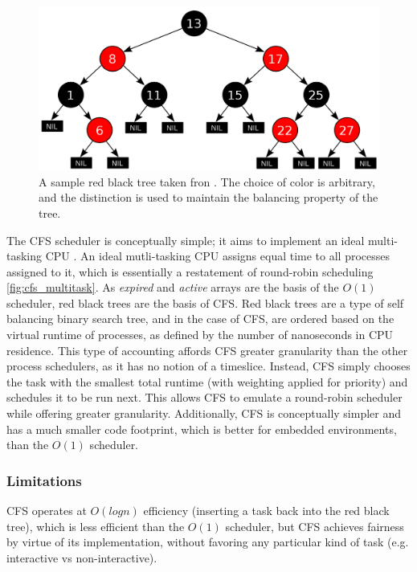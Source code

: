 \documentclass{sig-alternate-10pt}
\begin{document}
\begin{figure}
	\begin{center}
		\includegraphics[width=0.9\linewidth]{fig/rbtree.png}
		\caption{
			A sample red black tree taken fron \protect\cite{wiki:rbtree}. The choice of color is arbitrary, and the distinction is used to maintain the balancing property of the tree.
		}
		\label{fig:rbtree}
	\end{center}
\end{figure}

The CFS scheduler is conceptually simple; it aims to implement an ideal multi-tasking CPU \cite{cfsdesign}. An ideal mutli-tasking CPU assigns equal time to all processes assigned to it, which is essentially a restatement of round-robin scheduling \ref{fig:cfs_multitask}. As \emph{expired} and \emph{active} arrays are the basis of the $ O(1) $ scheduler, red black trees are the basis of CFS. Red black trees are a type of self balancing binary search tree, and in the case of CFS, are ordered based on the virtual runtime of processes, as defined by the number of nanoseconds in CPU residence. This type of accounting affords CFS greater granularity than the other process schedulers, as it has no notion of a timeslice. Instead, CFS simply chooses the task with the smallest total runtime (with weighting applied for priority) and schedules it to be run next. This allows CFS to emulate a round-robin scheduler while offering greater granularity. Additionally, CFS is conceptually simpler and has a much smaller code footprint, which is better for embedded environments, than the $ O(1) $ scheduler.

\subsubsection{Limitations}
CFS operates at $ O(log n) $ efficiency (inserting a task back into the red black tree), which is less efficient than the $ O(1) $ scheduler, but CFS achieves fairness by virtue of its implementation, without favoring any particular kind of task (e.g. interactive vs non-interactive).
\end{document}
